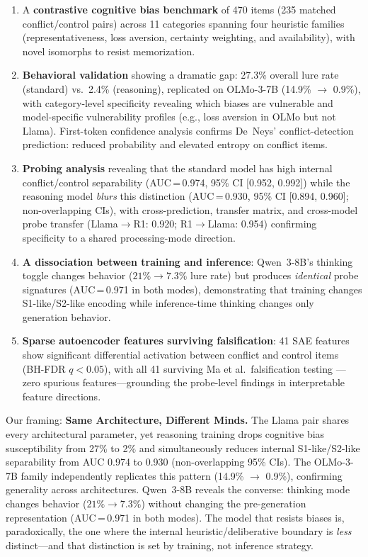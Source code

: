 \documentclass[accepted]{article}
\newcommand{\sone}{S1-like}
\newcommand{\stwo}{S2-like}
\begin{document}
\begin{enumerate}[leftmargin=*,itemsep=2pt]
  \item A \textbf{contrastive cognitive bias benchmark} of 470 items
  (235 matched conflict/control pairs) across 11 categories spanning
  four heuristic families (representativeness, loss aversion, certainty
  weighting, and availability), with novel isomorphs to resist
  memorization.

  \item \textbf{Behavioral validation} showing a dramatic gap: 27.3\%
  overall lure rate (standard) vs.\ 2.4\% (reasoning), replicated on
  OLMo-3-7B (14.9\% $\to$ 0.9\%), with category-level specificity
  revealing which biases are vulnerable and model-specific vulnerability
  profiles (e.g., loss aversion in OLMo but not Llama).  First-token
  confidence analysis confirms De~Neys' conflict-detection prediction:
  reduced probability and elevated entropy on conflict items.

  \item \textbf{Probing analysis} revealing that the standard model has
  high internal conflict/control separability (AUC\,=\,0.974, 95\% CI
  [0.952, 0.992]) while the reasoning model \emph{blurs} this distinction
  (AUC\,=\,0.930, 95\% CI [0.894, 0.960]; non-overlapping CIs), with
  cross-prediction, transfer matrix, and cross-model probe transfer
  (Llama$\to$R1: 0.920; R1$\to$Llama: 0.954) confirming specificity
  to a shared processing-mode direction.

  \item \textbf{A dissociation between training and inference}: Qwen~3-8B's
  thinking toggle changes behavior ($21\% \to 7.3\%$ lure rate) but produces
  \emph{identical} probe signatures (AUC\,=\,0.971 in both modes),
  demonstrating that training changes \sone{}/\stwo{} encoding while
  inference-time thinking changes only generation behavior.

  \item \textbf{Sparse autoencoder features surviving falsification}: 41
  SAE features show significant differential activation between conflict
  and control items (BH-FDR $q < 0.05$), with all 41 surviving Ma et
  al.\ falsification testing \citep{ma2026falsification}---zero spurious
  features---grounding the probe-level findings in interpretable feature
  directions.
\end{enumerate}

\noindent Our framing: \textbf{Same Architecture, Different Minds.}
The Llama pair shares every architectural parameter, yet reasoning
training drops cognitive bias susceptibility from 27\% to 2\% and
simultaneously reduces internal \sone{}/\stwo{} separability from
AUC 0.974 to 0.930 (non-overlapping 95\% CIs).  The OLMo-3-7B family
independently replicates this pattern (14.9\% $\to$ 0.9\%), confirming
generality across architectures.  Qwen~3-8B reveals the converse: thinking mode
changes behavior ($21\% \to 7.3\%$) without changing the pre-generation
representation (AUC\,=\,0.971 in both modes).  The model that resists
biases is, paradoxically, the one where the internal
heuristic/deliberative boundary is \emph{less} distinct---and that
distinction is set by training, not inference strategy.
\end{document}
